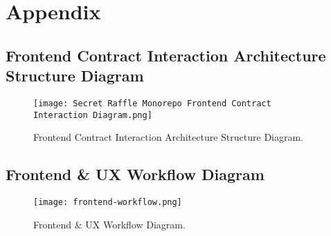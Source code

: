 \documentclass{article}
\begin{document}
\section{Appendix}

\subsection{Frontend Contract Interaction Architecture Structure Diagram}
\begin{figure}[h]
  \vspace{-0.5cm}
  \hspace{-2cm}
  \texttt{[image: Secret Raffle Monorepo Frontend Contract Interaction Diagram.png]}
  \caption{Frontend Contract Interaction Architecture Structure Diagram.}
  \label{fig:Frontend Contract Interaction Architecture Structure Diagram Appendix}
\end{figure}

\newpage

\subsection{Frontend \& UX Workflow Diagram}
\begin{figure}[h]
  \vspace{0cm}
  \hspace{0cm}
  \texttt{[image: frontend-workflow.png]}
  \caption{Frontend \& UX Workflow Diagram.}
  \label{fig:Frontend Workflow Appendix}
\end{figure}

\newpage
\end{document}
